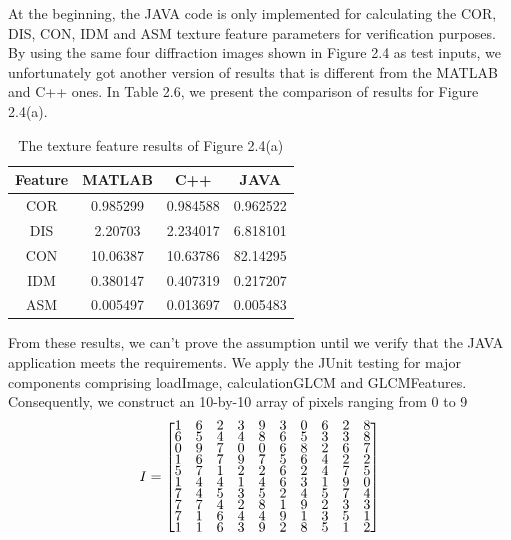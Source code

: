 At the beginning, the JAVA code is only implemented for calculating the COR, DIS, CON, IDM and ASM texture feature parameters for verification purposes. By using the same four diffraction images shown in Figure 2.4 as test inputs, we unfortunately got another version of results that is different from the MATLAB and C++ ones. In Table 2.6, we present the comparison of results for Figure 2.4(a). 
\begin{table}[!t]
\begin{center}
\begin{tabular}{||c c c c||}
\hline
Feature & MATLAB & C++ & JAVA\\[0.7ex]
\hline\hline
COR & 0.985299 & 0.984588 & 0.962522 \\
DIS & 2.20703 & 2.234017 & 6.818101\\
CON & 10.06387 & 10.63786 & 82.14295 \\
IDM & 0.380147 & 0.407319 & 0.217207 \\
ASM & 0.005497 & 0.013697 & 0.005483\\
\hline
\end{tabular}
\caption{The texture feature results of Figure 2.4(a)}
\end{center}
\end{table}
From these results, we can't prove the assumption until we verify that the JAVA application meets the requirements. We apply the JUnit testing for major components comprising loadImage, calculationGLCM and GLCMFeatures. Consequently, we construct an 10-by-10 array of pixels ranging from 0 to 9 
\begin{align*}
I = 
\renewcommand{\arraystretch}{0.5}
\begin{bmatrix}
    1 & 6 & 2 & 3 & 9 & 3 & 0 & 6 & 2 & 8\\
    6 & 5 & 4 & 4 & 8 & 6 & 5 & 3 & 3 & 8\\
    0 & 9 & 7 & 0 & 0 & 6 & 8 & 2 & 6 & 7\\
    1 & 6 & 7 & 9 & 7 & 5 & 6 & 4 & 2 & 2\\
    5 & 7 & 1 & 2 & 2 & 6 & 2 & 4 & 7 & 5\\
    1 & 4 & 4 & 1 & 4 & 6 & 3 & 1 & 9 & 0\\
    7 & 4 & 5 & 3 & 5 & 2 & 4 & 5 & 7 & 4\\
    7 & 7 & 4 & 2 & 8 & 1 & 9 & 2 & 3 & 3\\
    7 & 1 & 6 & 4 & 4 & 9 & 1 & 3 & 5 & 1\\
    1 & 1 & 6 & 3 & 9 & 2 & 8 & 5 & 1 & 2
\end{bmatrix}
\end{align*}
